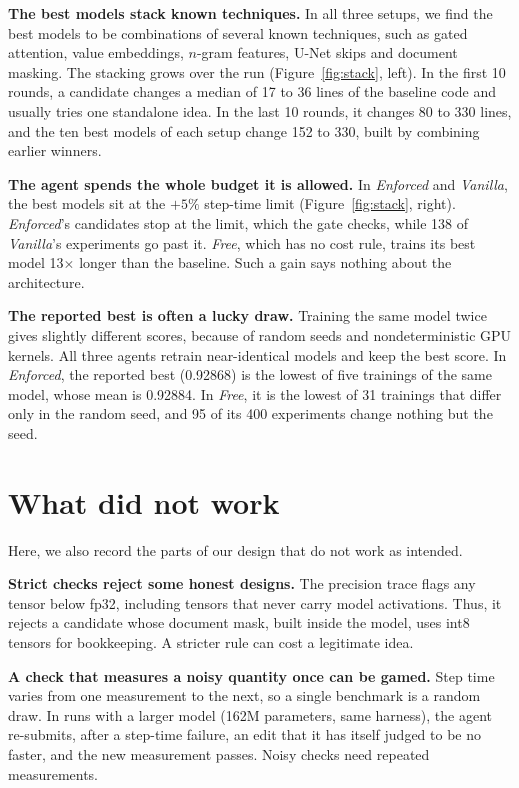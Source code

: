 \documentclass{article}
\begin{document}
\textbf{The best models stack known techniques.} In all three setups, we find the best models to be
combinations of several known techniques, such as gated attention, value embeddings, $n$-gram features, U-Net
skips and document masking. The stacking grows over the run (Figure~\ref{fig:stack}, left). In the first 10 rounds, a candidate changes a median
of 17 to 36 lines of the baseline code and usually tries one standalone idea. In the last 10 rounds, it changes 80
to 330 lines, and the ten best models of each setup change 152 to 330, built by combining earlier winners.

\textbf{The agent spends the whole budget it is allowed.} In \emph{Enforced} and \emph{Vanilla}, the best models
sit at the $+5\%$ step-time limit (Figure~\ref{fig:stack}, right). \emph{Enforced}'s candidates stop at the limit,
which the gate checks, while 138 of \emph{Vanilla}'s experiments go past it. \emph{Free}, which has no cost rule,
trains its best model 13$\times$ longer than the baseline. Such a gain says nothing about the architecture.

\textbf{The reported best is often a lucky draw.} Training the same model twice gives slightly different
scores, because of random seeds and nondeterministic GPU kernels. All three agents retrain near-identical models
and keep the best score. In \emph{Enforced}, the reported best (0.92868) is the lowest of five trainings of the
same model, whose mean is 0.92884. In \emph{Free}, it is the lowest of 31 trainings that differ only in the random
seed, and 95 of its 400 experiments change nothing but the seed.

\section{What did not work}

Here, we also record the parts of our design that do not work as intended.

\textbf{Strict checks reject some honest designs.} The precision trace flags any tensor below fp32, including
tensors that never carry model activations. Thus, it rejects a candidate whose document mask, built inside the
model, uses int8 tensors for bookkeeping. A stricter rule can cost a legitimate idea.

\textbf{A check that measures a noisy quantity once can be gamed.} Step time varies from one measurement to the
next, so a single benchmark is a random draw. In runs with a larger model (162M parameters, same harness), the
agent re-submits, after a step-time failure, an edit that it has itself judged to be no faster, and the new
measurement passes. Noisy checks need repeated measurements.
\end{document}
